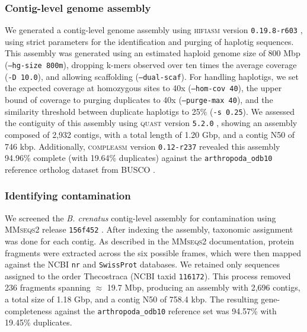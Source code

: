\documentclass[11pt]{article}
\begin{document}
\subsubsection*{Contig-level genome assembly}

We generated a contig-level genome assembly using \textsc{hifiasm} version
\texttt{0.19.8-r603} \citep{cheng_haplotype-resolved_2021,cheng_haplotype-resolved_2022},
using strict parameters for the identification and purging of haplotig sequences.
This assembly was generated using an estimated haploid genome size of 800 Mbp
(\texttt{--hg-size 800m}), dropping k-mers observed over ten times the average coverage
(\texttt{-D 10.0}), and allowing scaffolding (\texttt{--dual-scaf}).
For handling haplotigs, we set the expected coverage at homozygous sites to
40x (\texttt{--hom-cov 40}), the upper bound of coverage to purging duplicates to 40x
(\texttt{--purge-max 40}), and the similarity threshold between duplicate haplotigs
to 25\% (\texttt{-s 0.25}).
We assessed the contiguity of this assembly using \textsc{quast} version \texttt{5.2.0}
\citep{gurevich_quast_2013}, showing an assembly composed of 2,932 contigs, with a total
length of 1.20 Gbp, and a contig N50 of 746 kbp.
Additionally, \textsc{compleasm} version \texttt{0.12-r237} \citep{huang_compleasm_2023}
revealed this assembly 94.96\% complete (with 19.64\% duplicates) against the
\texttt{arthropoda\_odb10} reference ortholog dataset from \textsc{BUSCO}
\citep{simao_busco_2015,manni_busco_2021,tegenfeldt_orthodb_2025}.

\subsubsection*{Identifying contamination}

We screened the \textit{B. crenatus} contig-level assembly for contamination using
\textsc{MMseqs2} release \texttt{15\-6f452} \citep{steinegger_mmseqs2_2017}.
After indexing the assembly, taxonomic assignment was done for each contig.
As described in the \textsc{MMseqs2} documentation, protein fragments were extracted
across the six possible frames, which were then mapped against the NCBI \texttt{nr} and
\texttt{SwissProt} databases.
We retained only sequences assigned to the order Thecostraca (NCBI taxid
\texttt{116172}).
This process removed 236 fragments spanning $\approx$ 19.7 Mbp, producing an assembly
with 2,696 contigs, a total size of 1.18 Gbp, and a contig N50 of 758.4 kbp.
The resulting gene-completeness against the \texttt{arthropoda\_odb10} reference
set was 94.57\% with 19.45\% duplicates.
\end{document}
